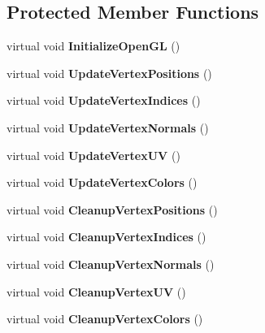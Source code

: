 \subsection*{Protected Member Functions}
\begin{DoxyCompactItemize}
\item 
\hypertarget{class_rendering_object_a77c78d1b42ea2ebfdbf994b6b91ce805}{}virtual void {\bfseries Initialize\+Open\+G\+L} ()\label{class_rendering_object_a77c78d1b42ea2ebfdbf994b6b91ce805}

\item 
\hypertarget{class_rendering_object_a7a097727acf37f9671ddd5e3a9873771}{}virtual void {\bfseries Update\+Vertex\+Positions} ()\label{class_rendering_object_a7a097727acf37f9671ddd5e3a9873771}

\item 
\hypertarget{class_rendering_object_afb49054121b1b552bce58625db91b851}{}virtual void {\bfseries Update\+Vertex\+Indices} ()\label{class_rendering_object_afb49054121b1b552bce58625db91b851}

\item 
\hypertarget{class_rendering_object_ae4b537e1c9b1c5c50cb7b0db83e6f190}{}virtual void {\bfseries Update\+Vertex\+Normals} ()\label{class_rendering_object_ae4b537e1c9b1c5c50cb7b0db83e6f190}

\item 
\hypertarget{class_rendering_object_ac00889f2afaa605b09164649ef68a1b6}{}virtual void {\bfseries Update\+Vertex\+U\+V} ()\label{class_rendering_object_ac00889f2afaa605b09164649ef68a1b6}

\item 
\hypertarget{class_rendering_object_aca18dbb9252f27cef09df307dbcf02a9}{}virtual void {\bfseries Update\+Vertex\+Colors} ()\label{class_rendering_object_aca18dbb9252f27cef09df307dbcf02a9}

\item 
\hypertarget{class_rendering_object_af9c1a07398071cdd0cca3ad36095fc85}{}virtual void {\bfseries Cleanup\+Vertex\+Positions} ()\label{class_rendering_object_af9c1a07398071cdd0cca3ad36095fc85}

\item 
\hypertarget{class_rendering_object_ac60c8a7f3d5678fd4aa8198f6c980e6e}{}virtual void {\bfseries Cleanup\+Vertex\+Indices} ()\label{class_rendering_object_ac60c8a7f3d5678fd4aa8198f6c980e6e}

\item 
\hypertarget{class_rendering_object_ad89bc24893f8fe32794f0686c2bb0da1}{}virtual void {\bfseries Cleanup\+Vertex\+Normals} ()\label{class_rendering_object_ad89bc24893f8fe32794f0686c2bb0da1}

\item 
\hypertarget{class_rendering_object_a776f54b41f9e9f0e55fc1104919c3e7c}{}virtual void {\bfseries Cleanup\+Vertex\+U\+V} ()\label{class_rendering_object_a776f54b41f9e9f0e55fc1104919c3e7c}

\item 
\hypertarget{class_rendering_object_adce4a6d6406eb589b088bedd19127f32}{}virtual void {\bfseries Cleanup\+Vertex\+Colors} ()\label{class_rendering_object_adce4a6d6406eb589b088bedd19127f32}

\end{DoxyCompactItemize}
